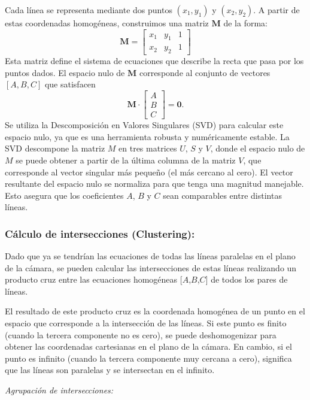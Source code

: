 

Cada línea se representa mediante dos puntos $(x_1, y_1)$ y $(x_2, y_2)$. A partir de estas coordenadas homogéneas,
construimos una matriz $\mathbf{M}$ de la forma:
\[
    \mathbf{M} = \begin{bmatrix}
        x_1 & y_1 & 1 \\
        x_2 & y_2 & 1
    \end{bmatrix}
\]
Esta matriz define el sistema de ecuaciones que describe la recta que pasa por los puntos dados.
El espacio nulo de $\mathbf{M}$ corresponde al conjunto de vectores $[A,B,C]$ que satisfacen
\[
    \mathbf{M} \cdot \begin{bmatrix}
        A \\ B \\ C
    \end{bmatrix} = \mathbf{0}.
\]
Se utiliza la Descomposición en Valores Singulares (SVD) \cite{golub2013matrix}  para calcular este espacio nulo, ya que es una herramienta robusta y numéricamente estable.
La SVD descompone la matriz \(M\) en tres matrices \(U\), \(S\) y \(V\), donde el espacio nulo de \(M\) se puede obtener a partir de la última columna de la matriz \(V\), que corresponde al vector singular más pequeño (el más cercano al cero).
El vector resultante del espacio nulo se normaliza para que tenga una magnitud manejable.
Esto asegura que los coeficientes \(A\), \(B\) y \(C\) sean comparables entre distintas líneas.

\subsubsection{Cálculo de intersecciones (Clustering):}
\noindent
Dado que ya se tendrían las ecuaciones de todas las líneas paralelas en el plano de la cámara, se pueden calcular las intersecciones de estas líneas realizando un producto cruz entre las ecuaciones homogéneas [\(A\),\(B\),\(C\)] de todos los pares de líneas.

El resultado de este producto cruz es la coordenada homogénea de un punto en el espacio que corresponde a la intersección de las líneas.
Si este punto es finito (cuando la tercera componente no es cero), se puede deshomogenizar para obtener las coordenadas cartesianas en el plano de la cámara.
En cambio, si el punto es infinito (cuando la tercera componente muy cercana a cero), significa que las líneas son paralelas y se intersectan en el infinito.


\textit{Agrupación de intersecciones:}

